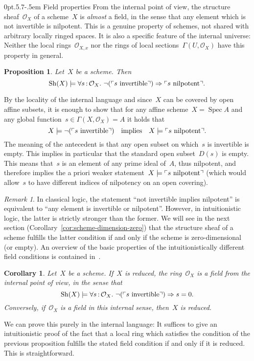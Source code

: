 \documentclass[10pt,reqno,a4paper]{amsbook}
\makeatletter
\theoremstyle{definition}
\theoremstyle{plain}
\newtheorem{prop}[defn]{Proposition}
\newtheorem{cor}[defn]{Corollary}
\theoremstyle{remark}
\newtheorem{rem}[defn]{Remark}
\renewcommand{\O}{\mathcal{O}}
\newcommand{\Sh}{\mathrm{Sh}}
\DeclareMathOperator{\Spec}{Spec}
\newcommand{\?}{\,{:}\,}
\renewcommand{\_}{\mathpunct{.}\,}
\newcommand{\speak}[1]{\ulcorner\text{\textnormal{#1}}\urcorner}
\renewenvironment{proof}[1][\proofname]{\par
  \pushQED{\qed}%
  \normalfont \topsep6\p@\@plus6\p@\relax
  \trivlist
  \item[\hskip\labelsep
        \itshape
    #1\@addpunct{.}]\ignorespaces
}{%
  \popQED\endtrivlist\@endpefalse
}
\def\subsection{\@startsection{subsection}{2}%
  {0pt}{.5\linespacing\@plus.7\linespacing}{-.5em}%
  {\normalfont\bfseries}}
\makeatother
\begin{document}
\subsection{Field properties} From the internal point of view, the structure
sheaf~$\O_X$ of a scheme~$X$ is \emph{almost} a field, in the sense that any
element which is not invertible is nilpotent. This is a genuine property of
schemes, not shared with arbitrary locally ringed spaces. It is also a specific
feature of the internal universe: Neither the local rings~$\O_{X,x}$ nor the
rings of local sections~$\Gamma(U,\O_X)$ have this property in general.

\begin{prop}\label{prop:neginvnilpotent}Let~$X$ be a scheme. Then
\[ \Sh(X) \models \forall s\?\O_X\_ \neg(\speak{$s$ invertible}) \Rightarrow
\speak{$s$ nilpotent}. \]
\end{prop}
\begin{proof}By the locality of the internal language and since~$X$ can be
covered by open affine subsets, it is enough to show that for any affine
scheme~$X = \Spec A$ and any global function~$s \in \Gamma(X,\O_X) = A$ it holds
that
\[ X \models \neg(\speak{$s$ invertible}) \quad\text{implies}\quad
  X \models \speak{$s$ nilpotent}. \]
The meaning of the antecedent is that any open subset on which~$s$ is
invertible is empty. This implies in particular that the standard open subset~$D(s)$ is
empty. This means that~$s$ is an element of any prime ideal of~$A$, thus
nilpotent, and therefore implies the a priori weaker statement~$X \models \speak{$s$
nilpotent}$ (which would allow~$s$ to have different indices of nilpotency on
an open covering).
\end{proof}

\begin{rem}In classical logic, the statement ``not invertible implies
nilpotent'' is equivalent to ``any element is invertible or nilpotent''.
However, in intuitionistic logic, the latter is strictly stronger than the
former. We will see in the next section
(Corollary~\ref{cor:scheme-dimension-zero}) that the structure sheaf of a
scheme fulfills the latter condition if and only if the scheme is
zero-dimensional (or empty). An overview of the basic properties of the
intuitionistically different field conditions is contained
in~\cite{johnstone:rings-fields-and-spectra}.
\end{rem}

\begin{cor}\label{cor:field-reduced}
Let~$X$ be a scheme. If~$X$ is reduced, the ring~$\O_X$ is a field
from the internal point of view, in the sense that
\[ \Sh(X) \models \forall s\?\O_X\_ \neg(\speak{$s$ invertible}) \Rightarrow
s=0. \]
Conversely, if~$\O_X$ is a field in this internal sense, then~$X$ is reduced.\end{cor}
\begin{proof}We can prove this purely in the internal language: It suffices to
give an intuitionistic proof of the fact that a local ring which satisfies the
condition of the previous proposition fulfills the stated field condition if
and only if it is reduced. This is straightforward.
\end{proof}
\end{document}
